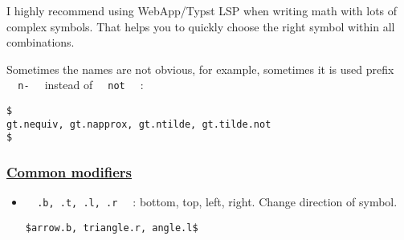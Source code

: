 \pandocbounded{}

I highly recommend using WebApp/Typst LSP when writing math with lots of
complex symbols. That helps you to quickly choose the right symbol
within all combinations.

Sometimes the names are not obvious, for example, sometimes it is used
prefix \texttt{\ }{\texttt{\ n-\ }}\texttt{\ } instead of
\texttt{\ }{\texttt{\ not\ }}\texttt{\ } :

\begin{verbatim}
$
gt.nequiv, gt.napprox, gt.ntilde, gt.tilde.not
$
\end{verbatim}

\pandocbounded{}

\subsubsection{\texorpdfstring{\hyperref[common-modifiers]{Common
modifiers}}{Common modifiers}}\label{common-modifiers}

\begin{itemize}
\item
  \texttt{\ }{\texttt{\ .b,\ .t,\ .l,\ .r\ }}\texttt{\ } : bottom, top,
  left, right. Change direction of symbol.

\begin{verbatim}
$arrow.b, triangle.r, angle.l$
\end{verbatim}

  \pandocbounded{}
\end{itemize}
